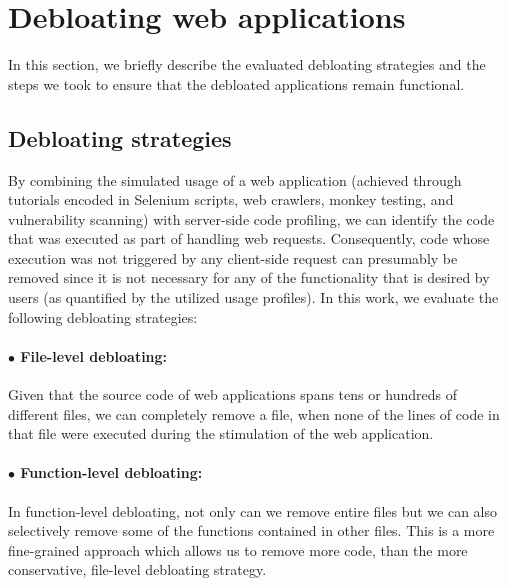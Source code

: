 \section{Debloating web applications}
\label{sec:debloating}

In this section, we briefly describe the evaluated debloating strategies and
the steps we took to ensure that the debloated applications remain functional.


\subsection{Debloating strategies}

By combining the simulated usage of a web application (achieved through
tutorials encoded in Selenium scripts, web crawlers, monkey testing, and
vulnerability scanning) with
server-side code profiling, we can identify the code that was executed
as part of handling web requests. Consequently, code whose execution was
not triggered by any client-side request can presumably be removed since
it is not necessary for any of the functionality that is desired by users
(as quantified by the utilized usage profiles).
In this work, we evaluate the following debloating strategies:
\vspace{-2ex}
\paragraph{$\bullet$ File-level debloating:} Given that the source code of web
applications spans tens or hundreds of different files, we can completely
remove a file, when none of the lines of code in that file were executed
during the stimulation of the web application.
\vspace{-2ex}
\paragraph{$\bullet$ Function-level debloating:} In function-level debloating, not
only can we remove entire files but we can also selectively remove some of
the functions contained in other files. This is a more fine-grained approach
which allows us to remove more code, than the more conservative, file-level
debloating strategy.

%

